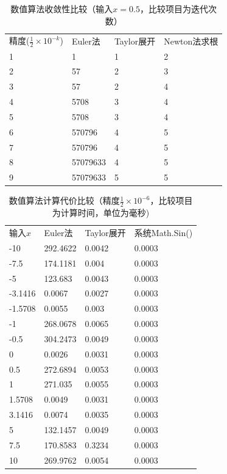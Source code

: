 \documentclass[lang=cn,11pt,a4paper]{elegantpaper}
\begin{document}
\begin{table}[htbp]
  \centering
  \caption{数值算法收敛性比较（输入$x=0.5$，比较项目为迭代次数）}
  \begin{tabular}{p{80pt}<{\centering}|p{80pt}<{\centering}|p{80pt}<{\centering}|p{80pt}<{\centering}}
  \Xhline{1.0pt}
  精度($\frac{1}{2}\times10^{-k}$) & Euler法 & Taylor展开 & Newton法求根 \\ \Xhline{1.0pt}
  1 & 1 & 1 & 2 \\ \hline
  2 & 57 & 2 & 3 \\ \hline
  3 & 57 & 2 & 4 \\ \hline
  4 & 5708 & 3 & 4 \\ \hline
  5 & 5708 & 3 & 4 \\ \hline
  6 & 570796 & 4 & 5 \\ \hline
  7 & 570796 & 4 & 5 \\ \hline
  8 & 57079633 & 4 & 5 \\ \hline
  9 & 57079633 & 5 & 5 \\ \hline
\end{tabular}
\end{table}

\begin{table}[htbp]
  \centering
  \caption{数值算法计算代价比较（精度$\frac{1}{2}\times 10^{-6}$，比较项目为计算时间，单位为毫秒)}
  \begin{tabular}{p{80pt}<{\centering}|p{80pt}<{\centering}|p{80pt}<{\centering}|p{80pt}<{\centering}}
  \Xhline{1.0pt}
  输入$x$ & Euler法 & Taylor展开 & 系统Math.Sin() \\ \Xhline{1.0pt}
  -10 & 292.4622 & 0.0042 & 0.0003 \\ \hline
  -7.5 & 174.1181 & 0.004 & 0.0003 \\ \hline
  -5 & 123.683 & 0.0043 & 0.0003 \\ \hline
  -3.1416 & 0.0067 & 0.0027 & 0.0003 \\ \hline
  -1.5708 & 0.0055 & 0.003 & 0.0003 \\ \hline
  -1 & 268.0678 & 0.0065 & 0.0003 \\ \hline
  -0.5 & 304.2473 & 0.0049 & 0.0003 \\ \hline
  0 & 0.0026 & 0.0031 & 0.0003 \\ \hline
  0.5 & 272.6894 & 0.0053 & 0.0003 \\ \hline
  1 & 271.035 & 0.0055 & 0.0003 \\ \hline
  1.5708 & 0.0049 & 0.0031 & 0.0003 \\ \hline
  3.1416 & 0.0074 & 0.0035 & 0.0003 \\ \hline
  5 & 132.1457 & 0.0049 & 0.0003 \\ \hline
  7.5 & 170.8583 & 0.3234 & 0.0003 \\ \hline
  10 & 269.9762 & 0.0054 & 0.0003 \\ \hline
\end{tabular}
\end{table}
\end{document}
